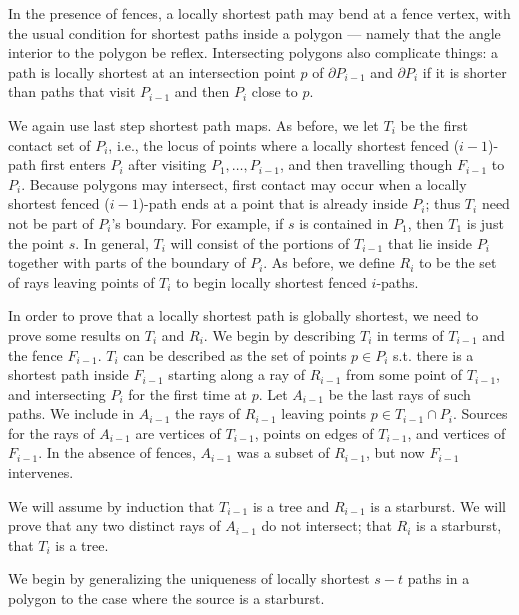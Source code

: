 \documentclass[a4paper]{article}
\begin{document}
In the presence of fences, a locally shortest path may bend at a fence vertex, with the usual condition for shortest paths inside a polygon — namely that the angle interior to the polygon be reflex. Intersecting polygons also complicate things: a path is locally shortest at an intersection point \(p\) of \(\partial P_{i-1}\) and \(\partial P_i\) if it is shorter than paths that visit \(P_{i-1}\) and then \(P_i\) close to \(p\).

We again use last step shortest path maps. As before, we let \(T_i\) be the first contact set of \(P_i\), i.e., the locus of points where a locally shortest fenced (\(i - 1\))-path first enters \(P_i\) after visiting \(P_1, \dots, P_{i-1}\), and then travelling though \(F_{i-1}\) to \(P_i\). Because polygons may intersect, first contact may occur when a locally shortest fenced (\(i - 1\))-path ends at a point that is already inside \(P_i\); thus \(T_i\) need not be part of \(P_i\)'s boundary. For example, if \(s\) is contained in \(P_1\), then \(T_1\) is just the point \(s\). In general, \(T_i\) will consist of the portions of \(T_{i-1}\) that lie inside \(P_i\) together with parts of the boundary of \(P_i\). As before, we define \(R_i\) to be the set of rays leaving points of \(T_i\) to begin locally shortest fenced \(i\)-paths. 

In order to prove that a locally shortest path is globally shortest, we need to prove some results on \(T_i\) and \(R_i\). We begin by describing \(T_i\) in terms of \(T_{i-1}\) and the fence \(F_{i-1}\). \(T_i\) can be described as the set of points \(p \in P_i\) s.t. there is a shortest path inside \(F_{i - 1}\) starting along a ray of \(R_{i - 1}\) from some point of \(T_{i - 1}\), and intersecting \(P_i\) for the first time at \(p\). Let \(A_{i - 1}\) be the last rays of such paths. We include in \(A_{i - 1}\) the rays of \(R_{i - 1}\) leaving points \(p \in T_{i - 1} \cap P_i\). Sources for the rays of \(A_{i - 1}\) are vertices of \(T_{i - 1}\), points on edges of \(T_{i - 1}\), and vertices of \(F_{i - 1}\). In the absence of fences, \(A_{i - 1}\) was a subset of \(R_{i - 1}\), but now \(F_{i - 1}\) intervenes. 

We will assume by induction that \(T_{i - 1}\) is a tree and \(R_{i - 1}\) is a starburst. We will prove that any two distinct rays of \(A_{i - 1}\) do not intersect; that \(R_i\) is a starburst, that \(T_i\) is a tree.

We begin by generalizing the uniqueness of locally shortest \(s-t\) paths in a polygon to the case where the source is a starburst.
\end{document}
